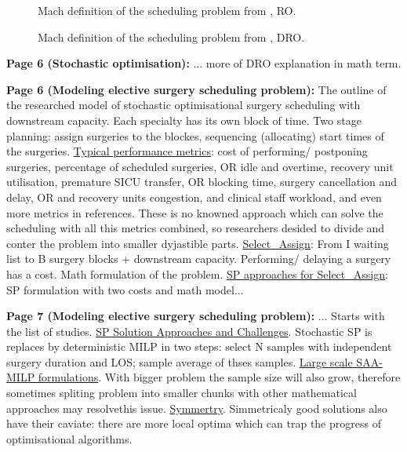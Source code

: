     \begin{figure}[H]
        \centering
        \caption{Mach definition of the scheduling problem from \cite{x335}, RO.}
        \label{fig6:0015_SR04US22}
    \end{figure}
    \begin{figure}[H]
        \centering
        \caption{Mach definition of the scheduling problem from \cite{x335}, DRO.}
        \label{fig7:0015_SR04US22}
    \end{figure}

    \textbf{Page 6 (Stochastic optimisation):}
    ... more of DRO explanation in math term.

    \textbf{Page 6 (Modeling elective surgery scheduling problem):}
    The outline of the researched model of stochastic optimisational surgery scheduling with downstream capacity. Each specialty has its own block of time. Two stage planning: assign surgeries to the blockes, sequencing (allocating) start times of the surgeries. \underline{Typical performance metrics}: cost of performing/ postponing surgeries, percentage of scheduled surgeries, OR idle and overtime, recovery unit utilisation, premature SICU transfer, OR blocking time, surgery cancellation and delay, OR and recovery units congestion, and clinical staff workload, and even more metrics in references. These is no knowned approach which can solve the scheduling with all this metrics combined, so researchers desided to divide and conter the problem into smaller dyjastible parts. \underline{Select\_Assign}: From I waiting list to B surgery blocks + downstream capacity. Performing/ delaying a surgery has a cost. Math formulation of the problem. \underline{SP approaches for Select\_Assign}: SP formulation with two costs and math model...

    \textbf{Page 7 (Modeling elective surgery scheduling problem):}
    ... Starts with the list of studies. \underline{SP Solution Approaches and Challenges}. Stochastic SP is replaces by deterministic MILP in two steps: select N samples with independent surgery duration and LOS; sample average of thses samples. \underline{Large scale SAA-MILP formulations}. With bigger problem the sample size will also grow, therefore sometimes spliting problem into smaller chunks with other mathematical approaches may resolvethis issue. \underline{Symmertry}. Simmetricaly good solutions also have their caviate: there are more local optima which can trap the progress of optimisational algorithms.
    
